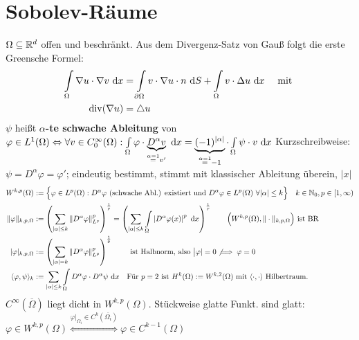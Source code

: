 \documentclass[12pt]{scrartcl}
\begin{document}
	\section{Sobolev-Räume}
	$\Omega\subseteq\mathbb{R}^d$ offen und beschränkt.
	Aus dem Divergenz-Satz von Gauß folgt die erste Greensche Formel:
	\begin{align}\label{eqGreen}
		\int\limits_\Omega\nabla u\cdot\nabla v\text{ d} x
		&=\int\limits_{\partial\Omega}v\cdot\nabla u\cdot n\text{ d} S+\int\limits_\Omega v\cdot\Delta u\text{ d} x\quad\text{ mit }\\
		\operatorname{div}(\nabla u)&=\triangle u\nonumber
	\end{align}
	$\psi$ heißt \textbf{$\alpha$-te schwache Ableitung} von $\varphi\in L^1(\Omega)\Leftrightarrow
		\forall v\in C_0^\infty(\Omega):\int\limits_\Omega\varphi\cdot \underbrace{D^\alpha v}_{\overset{\alpha=1}=v'}\text{ d} x
		=\underbrace{(-1)^{|\alpha|}}_{\overset{\alpha=1}{=}-1}\cdot\int\limits_\Omega\psi\cdot v\text{ d} x$
	Kurzschreibweise: $\psi=D^\alpha\varphi=\varphi'$; eindeutig bestimmt, stimmt mit klassischer Ableitung überein, $|x|$
	\begin{align*}
		W^{k,p}(\Omega)
		&:=\Big\lbrace\varphi\in L^p(\Omega):D^\alpha\varphi\text{ (schwache Abl.) existiert und }D^\alpha\varphi\in L^p(\Omega)~\forall|\alpha|\leq k\Big\rbrace
		\quad k\in\mathbb{N}_0,p\in[1,\infty)\\
		\Vert\varphi\Vert_{k,p,\Omega}
		&:=\left(\sum\limits_{|\alpha|\leq k}\left\Vert D^\alpha\varphi\right\Vert^p_{L^p}\right)^{\frac{1}{p}}
		=\left(\sum\limits_{|\alpha|\leq k}\int\limits_\Omega\left| D^\alpha\varphi(x)\right|^p\text{ d} x\right)^{\frac{1}{p}}\qquad\Big(W^{k,p}(\Omega),\Vert\cdot\Vert_{k,p,\Omega}\Big)\text{ ist BR}\\
		|\varphi|_{k,p,\Omega}
		&:=\left(\sum\limits_{|\alpha|= k}\left\Vert D^\alpha\varphi\right\Vert^p_{L^p}\right)^{\frac{1}{p}}\qquad\text{ ist Halbnorm, also }\big|\varphi|=0\not\implies\varphi=0\\
		\langle \varphi,\psi\rangle_k&:=\sum\limits_{|\alpha|\leq k}\int\limits_\Omega D^\alpha\varphi\cdot D^\alpha\psi\text{ d} x\quad\text{Für $p=2$ ist $H^k(\Omega):=W^{k,2}(\Omega)$ mit $\langle\cdot,\cdot\rangle$ Hilbertraum.}
	\end{align*}
	$C^\infty(\overline{\Omega})$ liegt dicht in $W^{k,p}(\Omega)$.
	Stückweise glatte Funkt. sind glatt:
	$\varphi\in W^{k,p}(\Omega)\overset{\varphi|_{\Omega_i}\in C^k(\overline{\Omega_i})}{\Longleftrightarrow}\varphi\in C^{k-1}(\Omega)$\\
\end{document}
